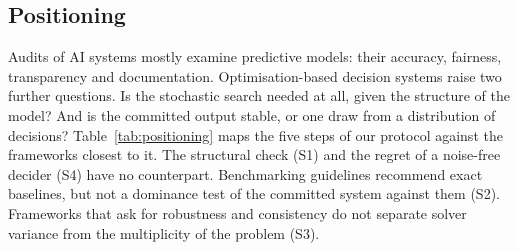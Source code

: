 \documentclass[systems,article,accept,moreauthors,pdftex]{Definitions/mdpi}
\begin{document}
\subsection{Positioning}\label{sec:positioning}
Audits of AI systems mostly examine predictive models: their accuracy, fairness,
transparency and documentation. Optimisation-based decision systems raise two further
questions. Is the stochastic search needed at all, given the structure of the model? And is
the committed output stable, or one draw from a distribution of decisions?
Table~\ref{tab:positioning} maps the five steps of our protocol against the frameworks closest
to it. The structural check (S1) and the regret of a noise-free decider (S4) have no
counterpart. Benchmarking guidelines recommend exact baselines, but not a dominance test of the
committed system against them (S2). Frameworks that ask for robustness and consistency do not
separate solver variance from the multiplicity of the problem (S3).
\end{document}
